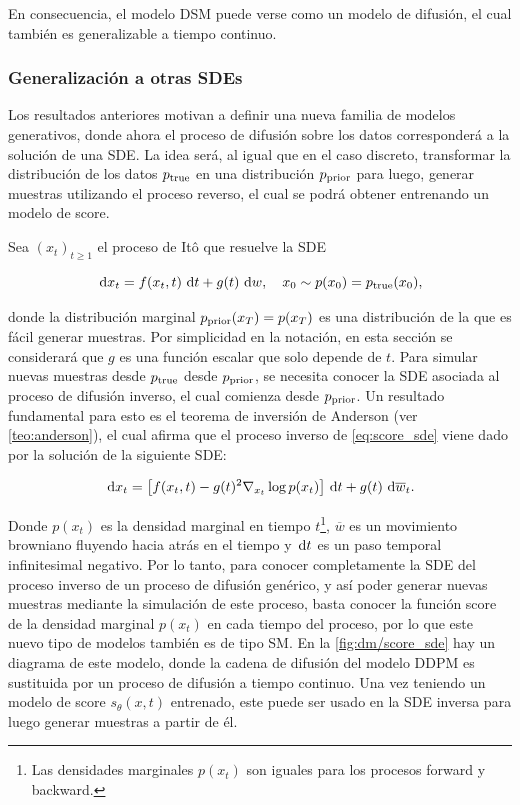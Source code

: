 En consecuencia, el modelo DSM puede verse como un modelo de difusión, el cual también es generalizable a tiempo continuo.

\subsubsection{Generalización a otras SDEs}

Los resultados anteriores motivan a definir una nueva familia de modelos generativos, donde ahora el proceso de difusión sobre los datos corresponderá a la solución de una SDE. La idea será, al igual que en el caso discreto, transformar la distribución de los datos $p_{\operatorname{true}}$ en una distribución $p_{\operatorname{prior}}$ para luego, generar muestras utilizando el proceso reverso, el cual se podrá obtener entrenando un modelo de score.

Sea $(x_t)_{t\geq 1}$ el proceso de Itô que resuelve la SDE

\begin{equation}
    \label{eq:score_sde}
    \,\operatorname{d}\! x_t = f(x_t,t)\,\operatorname{d}\! t+g(t) \,\operatorname{d}\! w, \quad x_0 \sim p(x_0)=p_{\operatorname{true}}(x_0),
\end{equation}

donde la distribución marginal $p_{\operatorname{prior}}(x_T) = p(x_T)$ es una distribución de la que es fácil generar muestras. Por simplicidad en la notación, en esta sección se considerará que $g$ es una función escalar que solo depende de $t$. Para simular nuevas muestras desde $p_{\operatorname{true}}$ desde $p_{\operatorname{prior}}$, se necesita conocer la SDE asociada al proceso de difusión inverso, el cual comienza desde $p_{\operatorname{prior}}$. Un resultado fundamental para esto es el teorema de inversión de Anderson (ver \autoref{teo:anderson}), el cual afirma que el proceso inverso de \eqref{eq:score_sde} viene dado por la solución de la siguiente SDE:

\begin{equation}
    \label{eq:score_reverse_sde}
    \,\operatorname{d}\! x_t = \left[f(x_t,t)-g(t)^2 \nabla_{x_t} \log p(x_t)\right]\,\operatorname{d}\! t + g(t)\,\operatorname{d}\!\overline{w}_t .
\end{equation}

Donde $p(x_t)$ es la densidad marginal en tiempo $t$\footnote{Las densidades marginales $p(x_t)$ son iguales para los procesos forward y backward.}, $\overline{w}$ es un movimiento browniano fluyendo hacia atrás en el tiempo y $\,\operatorname{d}\! t$ es un paso temporal infinitesimal negativo. Por lo tanto, para conocer completamente la SDE del proceso inverso de un proceso de difusión genérico, y así poder generar nuevas muestras mediante la simulación de este proceso, basta conocer la función score de la densidad marginal $p(x_t)$ en cada tiempo del proceso, por lo que este nuevo tipo de modelos también es de tipo SM. En la \autoref{fig:dm/score_sde} hay un diagrama de este modelo, donde la cadena de difusión del modelo DDPM es sustituida por un proceso de difusión a tiempo continuo. Una vez teniendo un modelo de score $s_\theta(x,t)$ entrenado, este puede ser usado en la SDE inversa para luego generar muestras a partir de él.

